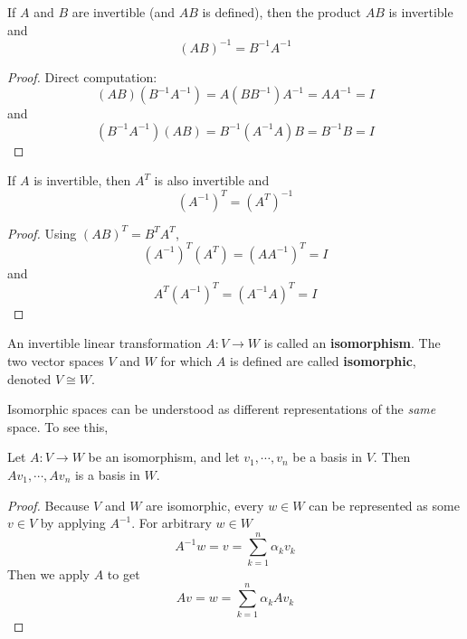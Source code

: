 \begin{theorem}
If $A$ and $B$ are invertible (and $AB$ is defined), then the product $AB$ is invertible and 
$$(AB)^{-1} = B^{-1} A^{-1}$$
\end{theorem}

\begin{proof}
Direct computation:
$$(AB)(B^{-1}A^{-1}) = A(BB^{-1})A^{-1} = AA^{-1} = I$$
and 
$$(B^{-1}A^{-1})(AB) = B^{-1}(A^{-1}A)B = B^{-1}B = I$$
\end{proof}

\begin{theorem}
If $A$ is invertible, then $A^{T}$ is also invertible and 
$$(A^{-1})^{T} = (A^{T})^{-1}$$
\end{theorem}

\begin{proof}
Using $(AB)^{T} = B^{T} A^{T}$, 
$$(A^{-1})^{T} (A^{T}) = (AA^{-1})^{T} = I$$
and 
$$A^{T}(A^{-1})^{T} = (A^{-1}A)^{T} = I$$
\end{proof}

\begin{definition}
An invertible linear transformation $A: V \rightarrow W$ is called an \textbf{isomorphism}. The two vector spaces $V$ and $W$ for which $A$ is defined are called \textbf{isomorphic}, denoted $V \cong W$. 
\end{definition}

Isomorphic spaces can be understood as different representations of the \textit{same} space. To see this, 
\begin{theorem}
Let $A : V \rightarrow W$ be an isomorphism, and let $v_{1}, \cdots, v_{n}$ be a basis in $V$. Then $Av_{1}, \cdots, Av_{n}$ is a basis in $W$. 
\end{theorem}

\begin{proof}
Because $V$ and $W$ are isomorphic, every $w \in W$ can be represented as some $v \in V$ by applying $A^{-1}$. For arbitrary $w \in W$
$$A^{-1}w = v = \sum_{k=1}^{n} \alpha_{k} v_{k}$$
Then we apply $A$ to get 
$$Av = w = \sum_{k=1}^{n} \alpha_{k} Av_{k}$$
\end{proof}